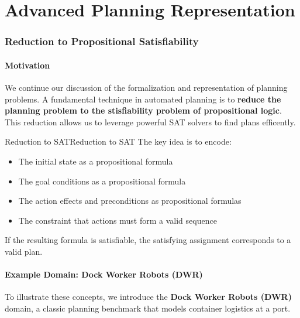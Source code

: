 \documentclass[a4paper]{article}
\theoremstyle{definition}
\begin{document}
\part{Advanced Planning Representation}
\section{Reduction to Propositional Satisfiability}
\subsection{Motivation}
We continue our discussion of the formalization and representation of planning problems.
A fundamental technique in automated planning is to \textbf{reduce the planning problem to the 
stisfiability problem of propositional logic}. This reduction allows us to leverage powerful SAT
solvers to find plans efficently.
\begin{definition}{Reduction to SAT}{Reduction to SAT}
The key idea is to encode:
\begin{itemize}
    \item The initial state as a propositional formula
    \item The goal conditions as a propositional formula 
    \item The action effects and preconditions as propositional formulas 
    \item The constraint that actions must form a valid sequence
\end{itemize}
If the resulting formula is satisfiable, the satisfying assignment corresponds to a valid plan.
\end{definition}
\subsection{Example Domain: Dock Worker Robots (DWR)}
To illustrate these concepts, we introduce the \textbf{Dock Worker Robots (DWR)} domain, a classic 
planning benchmark that models container logistics at a port.
\end{document}
